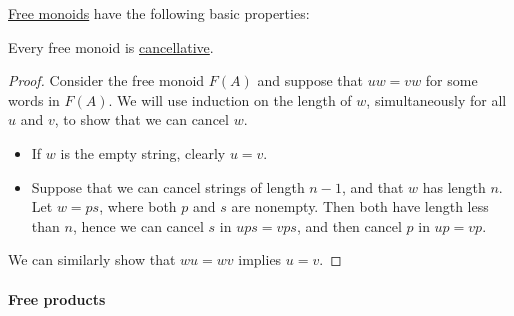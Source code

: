 \begin{proposition}\label{thm:def:free_monoid}
  \hyperref[def:free_monoid]{Free monoids} have the following basic properties:
  \begin{thmenum}
     Every free monoid is \hyperref[def:binary_operation/cancellative]{cancellative}.
  \end{thmenum}
\end{proposition}
\begin{proof}
   Consider the free monoid \( F(A) \) and suppose that \( uw = vw \) for some words in \( F(A) \). We will use induction on the length of \( w \), simultaneously for all \( u \) and \( v \), to show that we can cancel \( w \).
  \begin{itemize}
    \item If \( w \) is the empty string, clearly \( u = v \).
    \item Suppose that we can cancel strings of length \( n - 1 \), and that \( w \) has length \( n \). Let \( w = ps \), where both \( p \) and \( s \) are nonempty. Then both have length less than \( n \), hence we can cancel \( s \) in \( ups = vps \), and then cancel \( p \) in \( up = vp \).
  \end{itemize}

  We can similarly show that \( wu = wv \) implies \( u = v \).
\end{proof}

\paragraph{Free products}

